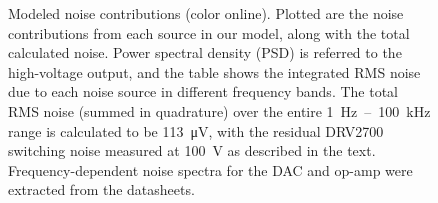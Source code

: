 \documentclass[aip,rsi,reprint]{revtex4-1} %
\begin{document}
\begin{figure}[t]

\caption{Modeled noise contributions (color online). Plotted are the noise contributions from each source in our model, along with the total calculated noise. Power spectral density (PSD) is referred to the high-voltage output, and the table shows the integrated RMS noise due to each noise source in different frequency bands. The total RMS noise (summed in quadrature) over the entire \SI{1}{\hertz}~--~\SI{100}{\kilo\hertz} range is calculated to be \SI{113}{\micro\volt}, with the residual DRV2700 switching noise measured at \SI{100}{\volt} as described in the text. Frequency-dependent noise spectra for the DAC and op-amp were extracted from the datasheets.\label{Fig:NoisePlot}}
\end{figure} 
\end{document}
